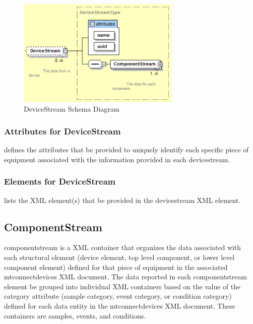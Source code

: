 \begin{figure}[ht]
  \centering
  \includegraphics[width=0.7\textwidth]{figures/devicestream-schema-diagram.png}
  \caption{DeviceStream Schema Diagram}
  \label{fig:devicestream-schema-diagram}
\end{figure}
\FloatBarrier

\subsubsection{Attributes for DeviceStream}

 defines the attributes that \must be provided to uniquely identify each specific piece of equipment associated with the information provided in each \gls{devicestream}.



\subsubsection{Elements for DeviceStream}

 lists the XML element(s) that \may be provided in the \gls{devicestream} XML element.  



\subsection{ComponentStream}\label{sec:ComponentStream}

\gls{componentstream} is a XML container that organizes the data associated with each \gls{structural element} (\gls{device} element, \gls{top level} \gls{component}, or \gls{lower level} \gls{component} element) defined for that piece of equipment in the associated \gls{mtconnectdevices} XML document.  The data reported in each \gls{componentstream} element \must be grouped into individual XML containers based on the value of the \gls{category} attribute (\gls{sample category}, \gls{event category}, or \gls{condition category}) defined for each \gls{data entity} in the \gls{mtconnectdevices} XML document.  These containers are \gls{samples}, \gls{events}, and \gls{conditions}.   

